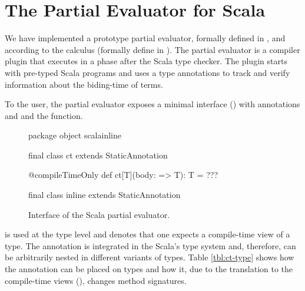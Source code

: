 \section{The Partial Evaluator for Scala}
\label{sct:interface}

We have implemented a prototype partial evaluator, formally defined in , and
 according to the \calculus calculus (formally define in ).
 The partial evaluator is a compiler plugin that executes in a phase after the
 Scala type checker. The plugin starts with pre-typed Scala programs and uses a
 type annotations  to track and verify information about the biding-time
 of terms.

To the user, the partial evaluator exposes a minimal interface () with
annotations  and  and the  function.

\begin{figure}
\begin{listing}
package object scalainline {
  final class ct extends StaticAnnotation

  @compileTimeOnly def ct[T](body: => T): T = ???

  final class inline extends StaticAnnotation
}
\end{listing}
\label{fig:interface}
\caption{Interface of the Scala partial evaluator.}
\end{figure}

 is used at the type level and denotes that one expects a
 compile-time view of a type. The annotation is integrated in the Scala's type system
 and, therefore, can be arbitrarily nested in different variants of types. Table
 \ref{tbl:ct-type} shows how the  annotation can be placed on types
 and how it, due to the translation to the compile-time views (),
 changes method signatures.


